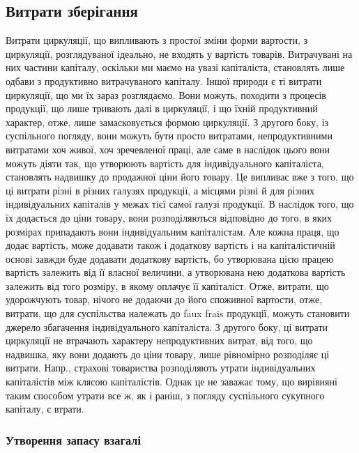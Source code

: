 \subsection{Витрати зберігання}

Витрати циркуляції, що випливають з простої зміни форми вартости,
з циркуляції, розглядуваної ідеально, не входять у вартість товарів.
Витрачувані на них частини капіталу, оскільки ми маємо на увазі капіталіста,
становлять лише одбави з продуктивно витрачуваного капіталу.
Іншої природи є ті витрати циркуляції, що ми їх зараз розглядаємо. Вони
можуть, походити з процесів продукції, що лише тривають далі в циркуляції,
і що їхній продуктивний характер, отже, лише замасковується формою
циркуляції. З другого боку, із суспільного погляду, вони можуть бути
просто витратами, непродуктивними витратами хоч живої, хоч зречевленої
праці, але саме в наслідок цього вони можуть діяти так, що утворюють
вартість для індивідуального капіталіста, становлять надвишку до продажної
ціни його товару. Це випливає вже з того, що ці витрати різні в різних галузях
продукції, а місцями різні й для різних індивідуальних капіталів у межах
тієї самої галузі продукції. В наслідок того, що їх додається до ціни
товару, вони розподіляються відповідно до того, в яких розмірах припадають
вони індивідуальним капіталістам. Але кожна праця, що додає
вартість, може додавати також і додаткову вартість і на капіталістичній
основі завжди буде додавати додаткову вартість, бо утворювана цією працею
вартість залежить від її власної величини, а утворювана нею додаткова
вартість залежить від того розміру, в якому оплачує її капіталіст.
Отже, витрати, що удорожчують товар, нічого не додаючи до його
споживної вартости, отже, витрати, що для суспільства належать до faux
frais продукції, можуть становити джерело збагачення індивідуального
капіталіста. З другого боку, ці витрати циркуляції не втрачають характеру
непродуктивних витрат, від того, що надвишка, яку вони додають до
ціни товару, лише рівномірно розподіляє ці витрати. Напр., страхові
товариства розподіляють утрати індивідуальних капіталістів між клясою
капіталістів. Однак це не заважає тому, що вирівняні таким способом
утрати все ж, як і раніш, з погляду суспільного сукупного капіталу, є втрати.

\subsubsection{Утворення запасу взагалі}

